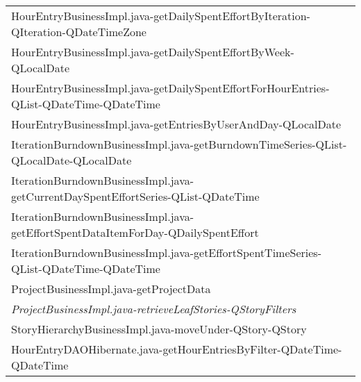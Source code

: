 \begin{table}[t!]
\begin{tabular}{l}
     HourEntryBusinessImpl.java-getDailySpentEffortByIteration-QIteration-QDateTimeZone                              \\%
     HourEntryBusinessImpl.java-getDailySpentEffortByWeek-QLocalDate                                            \\%
     HourEntryBusinessImpl.java-getDailySpentEffortForHourEntries-QList-QDateTime-QDateTime          \\%
     HourEntryBusinessImpl.java-getEntriesByUserAndDay-QLocalDate                                               \\%
     IterationBurndownBusinessImpl.java-getBurndownTimeSeries-QList-QLocalDate-QLocalDate \\%
     IterationBurndownBusinessImpl.java-getCurrentDaySpentEffortSeries-QList-QDateTime                \\%
     IterationBurndownBusinessImpl.java-getEffortSpentDataItemForDay-QDailySpentEffort                                \\%
     IterationBurndownBusinessImpl.java-getEffortSpentTimeSeries-QList-QDateTime-QDateTime           \\%
     ProjectBusinessImpl.java-getProjectData                                                                         \\%
     \emph{ProjectBusinessImpl.java-retrieveLeafStories-QStoryFilters}                                                     \\%
     StoryHierarchyBusinessImpl.java-moveUnder-QStory-QStory                                                         \\%
     HourEntryDAOHibernate.java-getHourEntriesByFilter-QDateTime-QDateTime                                         \\%

\end{tabular}
\end{table}
